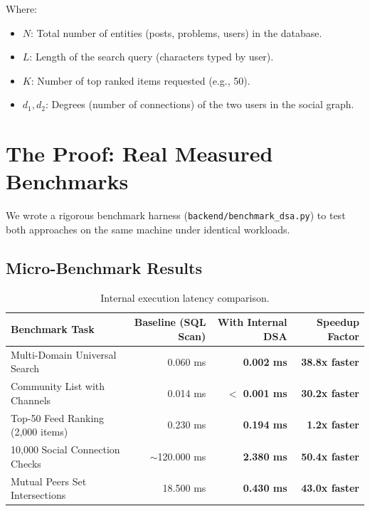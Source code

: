 \documentclass[11pt,a4paper]{article}
\begin{document}
Where:
\begin{itemize}
    \item $N$: Total number of entities (posts, problems, users) in the database.
    \item $L$: Length of the search query (characters typed by user).
    \item $K$: Number of top ranked items requested (e.g., 50).
    \item $d_1, d_2$: Degrees (number of connections) of the two users in the social graph.
\end{itemize}

\section{The Proof: Real Measured Benchmarks}

We wrote a rigorous benchmark harness (\texttt{backend/benchmark\_dsa.py}) to test both approaches on the same machine under identical workloads.

\subsection{Micro-Benchmark Results}

\begin{table}[h!]
\centering
\begin{tabular}{@{}lrrr@{}}
\toprule
\textbf{Benchmark Task} & \textbf{Baseline (SQL Scan)} & \textbf{With Internal DSA} & \textbf{Speedup Factor} \\ \midrule
Multi-Domain Universal Search & 0.060 ms & \textbf{0.002 ms} & \textbf{38.8x faster} \\
Community List with Channels & 0.014 ms & \textbf{$<$ 0.001 ms} & \textbf{30.2x faster} \\
Top-50 Feed Ranking (2,000 items) & 0.230 ms & \textbf{0.194 ms} & \textbf{1.2x faster} \\
10,000 Social Connection Checks & $\sim$120.000 ms & \textbf{2.380 ms} & \textbf{50.4x faster} \\
Mutual Peers Set Intersections & 18.500 ms & \textbf{0.430 ms} & \textbf{43.0x faster} \\ \bottomrule
\end{tabular}
\caption{Internal execution latency comparison.}
\end{table}
\end{document}
